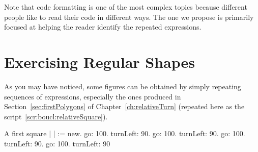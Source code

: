Note that code formatting is one of the most complex topics because different people like to read their code in different ways. The one we propose is primarily focused at helping the reader identify the repeated expressions.







\section{Exercising Regular Shapes}
As you may have noticed, some figures can be obtained by simply
repeating sequences of expressions, especially the ones produced in
Section~\ref{sec:firstPolygons} of Chapter~\ref{ch:relativeTurn} (repeated here as the script~\ref{scr:boucl:relativeSquare}). 


\begin{scriptwithtitle}{A first square} \label{scr:boucl:relativeSquare}
| \caro |
\caro := \Turtle new.
\caro go: 100.
\caro turnLeft: 90.
\caro go: 100.
\caro turnLeft: 90.
\caro go: 100.
\caro turnLeft: 90.
\caro go: 100.
\caro turnLeft: 90
\end{scriptwithtitle}



